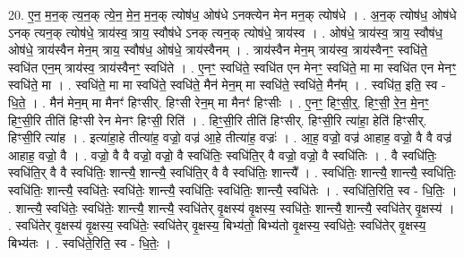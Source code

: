 \documentclass[17pt]{extarticle}
\begin{document}
20. ए॒न॒ म॒न॒क् त्य॒न॒क् त्ये॒न॒ मे॒न॒ म॒न॒क् त्योष॑ध॒ ओष॑धे ऽनक्त्येन मेन मन॒क् त्योष॑धे । . अ॒न॒क् त्योष॑ध॒ ओष॑धे ऽनक् त्यन॒क् त्योष॑धे॒ त्राय॑स्व॒ त्राय॒ स्वौष॑धे ऽनक् त्यन॒क् त्योष॑धे॒ त्राय॑स्व । . ओष॑धे॒ त्राय॑स्व॒ त्राय॒ स्वौष॑ध॒ ओष॑धे॒ त्राय॑स्वैन मेन॒म् त्राय॒ स्वौष॑ध॒ ओष॑धे॒ त्राय॑स्वैनम् । . त्राय॑स्वैन मेन॒म् त्राय॑स्व॒ त्राय॑स्वैनꣳ॒॒ स्वधि॑ते॒ स्वधि॑त एन॒म् त्राय॑स्व॒ त्राय॑स्वैनꣳ॒॒ स्वधि॑ते । . ए॒नꣳ॒॒ स्वधि॑ते॒ स्वधि॑त एन मेनꣳ॒॒ स्वधि॑ते॒ मा मा स्वधि॑त एन मेनꣳ॒॒ स्वधि॑ते॒ मा । . स्वधि॑ते॒ मा मा स्वधि॑ते॒ स्वधि॑ते॒ मैन॑ मेन॒म् मा स्वधि॑ते॒ स्वधि॑ते॒ मैन᳚म् । . स्वधि॑त॒ इति॒ स्व - धि॒ते॒ । . मैन॑ मेन॒म् मा मैनꣳ॑ हिꣳसीर्. हिꣳसी रेन॒म् मा मैनꣳ॑ हिꣳसीः । . ए॒नꣳ॒॒ हिꣳ॒॒सी॒र्॒. हिꣳ॒॒सी॒ रे॒न॒ मे॒नꣳ॒॒ हिꣳ॒॒सी॒रि तीति॑ हिꣳसी रेन मेनꣳ हिꣳसी॒ रिति॑ । . हिꣳ॒॒सी॒रि तीति॑ हिꣳसीर्. हिꣳसी॒रि त्या॑हा॒ हेति॑ हिꣳसीर्. हिꣳसी॒रि त्या॑ह । . इत्या॑हा॒हे तीत्या॑ह॒ वज्रो॒ वज्र॑ आ॒हे तीत्या॑ह॒ वज्रः॑ । . आ॒ह॒ वज्रो॒ वज्र॑ आहाह॒ वज्रो॒ वै वै वज्र॑ आहाह॒ वज्रो॒ वै । . वज्रो॒ वै वै वज्रो॒ वज्रो॒ वै स्वधि॑तिः॒ स्वधि॑ति॒र् वै वज्रो॒ वज्रो॒ वै स्वधि॑तिः । . वै स्वधि॑तिः॒ स्वधि॑ति॒र् वै वै स्वधि॑तिः॒ शान्त्यै॒ शान्त्यै॒ स्वधि॑ति॒र् वै वै स्वधि॑तिः॒ शान्त्यै᳚ । . स्वधि॑तिः॒ शान्त्यै॒ शान्त्यै॒ स्वधि॑तिः॒ स्वधि॑तिः॒ शान्त्यै॒ स्वधि॑तेः॒ स्वधि॑तेः॒ शान्त्यै॒ स्वधि॑तिः॒ स्वधि॑तिः॒ शान्त्यै॒ स्वधि॑तेः । . स्वधि॑ति॒रिति॒ स्व - धि॒तिः॒ । . शान्त्यै॒ स्वधि॑तेः॒ स्वधि॑तेः॒ शान्त्यै॒ शान्त्यै॒ स्वधि॑तेर् वृ॒क्षस्य॑ वृ॒क्षस्य॒ स्वधि॑तेः॒ शान्त्यै॒ शान्त्यै॒ स्वधि॑तेर् वृ॒क्षस्य॑ । . स्वधि॑तेर् वृ॒क्षस्य॑ वृ॒क्षस्य॒ स्वधि॑तेः॒ स्वधि॑तेर् वृ॒क्षस्य॒ बिभ्य॑तो॒ बिभ्य॑तो वृ॒क्षस्य॒ स्वधि॑तेः॒ स्वधि॑तेर् वृ॒क्षस्य॒ बिभ्य॑तः । . स्वधि॑ते॒रिति॒ स्व - धि॒तेः॒ । \newline
\end{document}
